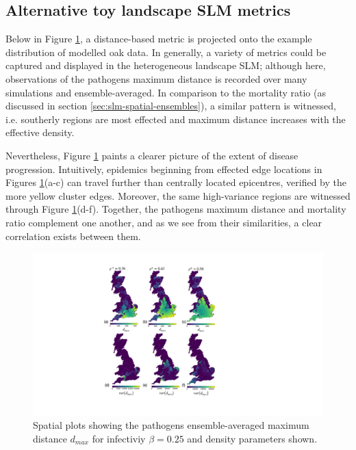 \subsection{Alternative toy landscape SLM metrics}
\label{a:landscape-toy-model}
Below in Figure \ref{fig:max-distance-metrix}, a distance-based metric is projected onto the example distribution of modelled oak data.
In generally, a variety of metrics could be captured and displayed in the heterogeneous landscape SLM;
although here, observations of the pathogens maximum distance is recorded over many simulations and ensemble-averaged.
In comparison to the mortality ratio (as discussed in section \ref{sec:slm-spatial-ensembles}), a similar pattern is witnessed,
i.e. southerly regions are most effected and maximum distance increases with the effective density.

Nevertheless, Figure \ref{fig:max-distance-metrix} paints a clearer picture of the extent of disease progression.
Intuitively, epidemics beginning from effected edge locations in Figures \ref{fig:max-distance-metrix}(a-c) can
travel further than centrally located epicentres, verified by the more yellow cluster edges.
Moreover, the same high-variance regions are witnessed through Figure \ref{fig:max-distance-metrix}(d-f).
Together, the pathogens maximum distance and mortality ratio complement one another, and 
as we see from their similarities, a clear correlation exists between them.

\begin{figure}
    \centering
    \includegraphics[scale=0.45]{appendix/figures/A-ch4figure1.pdf}
    \caption{Spatial plots showing the pathogens ensemble-averaged maximum distance $d_{max}$ for infectiviy $\beta=0.25$ and density parameters shown.}
    \label{fig:max-distance-metrix}
\end{figure}

